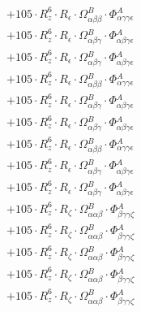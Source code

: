 \documentclass{article}
\begin{document}
\begin{subequations}
\begin{gather}
\begin{array}{c}
 \\[0.2em] 		 + 105 \cdot R_{z}^{6} \cdot R_{\epsilon{}} \cdot \Omega{}^{B}_{\alpha{}\beta{}\beta{}} \cdot \Phi{}^{A}_{\alpha{}\gamma{}\gamma{}\epsilon{}} 
 \\[0.2em] 		 + 105 \cdot R_{z}^{6} \cdot R_{\epsilon{}} \cdot \Omega{}^{B}_{\alpha{}\beta{}\gamma{}} \cdot \Phi{}^{A}_{\alpha{}\beta{}\gamma{}\epsilon{}} 
 \\[0.2em] 		 + 105 \cdot R_{z}^{6} \cdot R_{\epsilon{}} \cdot \Omega{}^{B}_{\alpha{}\beta{}\gamma{}} \cdot \Phi{}^{A}_{\alpha{}\beta{}\gamma{}\epsilon{}} 
 \\[0.2em] 		 + 105 \cdot R_{z}^{6} \cdot R_{\epsilon{}} \cdot \Omega{}^{B}_{\alpha{}\beta{}\beta{}} \cdot \Phi{}^{A}_{\alpha{}\gamma{}\gamma{}\epsilon{}} 
 \\[0.2em] 		 + 105 \cdot R_{z}^{6} \cdot R_{\epsilon{}} \cdot \Omega{}^{B}_{\alpha{}\beta{}\gamma{}} \cdot \Phi{}^{A}_{\alpha{}\beta{}\gamma{}\epsilon{}} 
 \\[0.2em] 		 + 105 \cdot R_{z}^{6} \cdot R_{\epsilon{}} \cdot \Omega{}^{B}_{\alpha{}\beta{}\gamma{}} \cdot \Phi{}^{A}_{\alpha{}\beta{}\gamma{}\epsilon{}} 
 \\[0.2em] 		 + 105 \cdot R_{z}^{6} \cdot R_{\epsilon{}} \cdot \Omega{}^{B}_{\alpha{}\beta{}\beta{}} \cdot \Phi{}^{A}_{\alpha{}\gamma{}\gamma{}\epsilon{}} 
 \\[0.2em] 		 + 105 \cdot R_{z}^{6} \cdot R_{\epsilon{}} \cdot \Omega{}^{B}_{\alpha{}\beta{}\gamma{}} \cdot \Phi{}^{A}_{\alpha{}\beta{}\gamma{}\epsilon{}} 
 \\[0.2em] 		 + 105 \cdot R_{z}^{6} \cdot R_{\epsilon{}} \cdot \Omega{}^{B}_{\alpha{}\beta{}\gamma{}} \cdot \Phi{}^{A}_{\alpha{}\beta{}\gamma{}\epsilon{}} 
 \\[0.2em] 		 + 105 \cdot R_{z}^{6} \cdot R_{\zeta{}} \cdot \Omega{}^{B}_{\alpha{}\alpha{}\beta{}} \cdot \Phi{}^{A}_{\beta{}\gamma{}\gamma{}\zeta{}} 
 \\[0.2em] 		 + 105 \cdot R_{z}^{6} \cdot R_{\zeta{}} \cdot \Omega{}^{B}_{\alpha{}\alpha{}\beta{}} \cdot \Phi{}^{A}_{\beta{}\gamma{}\gamma{}\zeta{}} 
 \\[0.2em] 		 + 105 \cdot R_{z}^{6} \cdot R_{\zeta{}} \cdot \Omega{}^{B}_{\alpha{}\alpha{}\beta{}} \cdot \Phi{}^{A}_{\beta{}\gamma{}\gamma{}\zeta{}} 
 \\[0.2em] 		 + 105 \cdot R_{z}^{6} \cdot R_{\zeta{}} \cdot \Omega{}^{B}_{\alpha{}\alpha{}\beta{}} \cdot \Phi{}^{A}_{\beta{}\gamma{}\gamma{}\zeta{}} 
 \\[0.2em] 		 + 105 \cdot R_{z}^{6} \cdot R_{\zeta{}} \cdot \Omega{}^{B}_{\alpha{}\alpha{}\beta{}} \cdot \Phi{}^{A}_{\beta{}\gamma{}\gamma{}\zeta{}} 

\end{array}
\end{gather}
\end{subequations}
\end{document}
